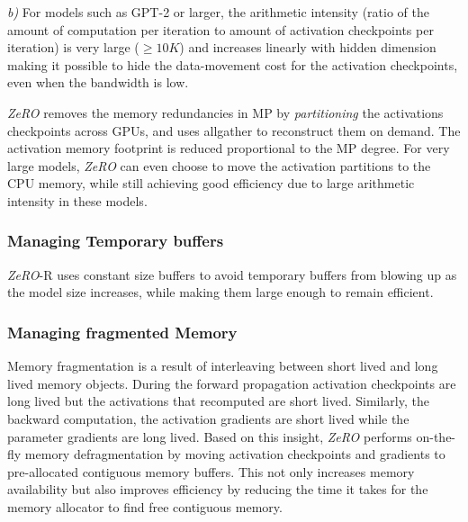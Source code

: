 \documentclass{article}
\newcommand{\name}{\emph{ZeRO}\xspace}
\begin{document}
{\it b)} For models such as GPT-2 or larger, the arithmetic intensity (ratio of the amount of computation per iteration to amount of activation checkpoints per iteration) is very large ($\ge 10K$) and increases linearly with hidden dimension making it possible to hide the data-movement cost for the activation checkpoints, even when the bandwidth is low.

\name removes the memory redundancies in MP by \emph{partitioning} the activations checkpoints across GPUs, and uses allgather to reconstruct them on demand. The activation memory footprint is reduced proportional to the MP degree. For very large models, \name can even choose to move the activation partitions to the CPU memory, while still achieving good efficiency due to large arithmetic intensity in these models. 
\subsubsection{Managing Temporary buffers}
\name-R uses constant size buffers to avoid temporary buffers from blowing up as the model size increases, while making them large enough to remain efficient. 

\subsubsection{Managing fragmented Memory} Memory fragmentation is a result of interleaving between short lived and long lived memory objects. During the forward propagation activation checkpoints are long lived but the activations that recomputed are short lived. Similarly, the backward computation, the activation gradients are short lived while the parameter gradients are long lived. Based on this insight, \name performs on-the-fly memory defragmentation by moving activation checkpoints and gradients to pre-allocated contiguous memory buffers. This not only increases memory availability but also improves efficiency by reducing the time it takes for the memory allocator to find free contiguous memory.  

\end{document}
